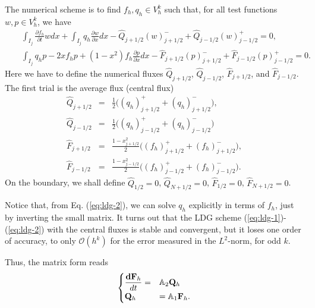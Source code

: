 \documentclass[final,leqno]{siamltex704}
\begin{document}
The numerical scheme is to find $f_h,q_h\in V_h^k$ such that, for all test functions $w,p\in V_h^k$, we have
\begin{eqnarray}
&&\int_{I_j}\frac{\partial f_h}{\partial t}wdx+\int_{I_j}q_h\frac{\partial w}{\partial x}dx-\hat{Q}_{j+1/2}(w)^-_{j+1/2}+\hat{Q}_{j-1/2}(w)^+_{j-1/2}=0,\label{eq:ldg-1}\\
&&\int_{I_j}q_h p-2xf_h p+(1-x^2)f_h\frac{\partial p}{\partial x}dx-\hat{F}_{j+1/2}(p)^-_{j+1/2}+\hat{F}_{j-1/2}(p)^+_{j-1/2}=0.\label{eq:ldg-2}
\end{eqnarray}
Here we have to define the numerical fluxes $\hat{Q}_{j+1/2}$, $\hat{Q}_{j-1/2}$, $\hat{F}_{j+1/2}$, and $\hat{F}_{j-1/2}$. The first trial is the average flux (central flux)
\begin{eqnarray}
\hat{Q}_{j+1/2}&=&\frac{1}{2}\bigg((q_h)_{j+1/2}^++(q_h)_{j+1/2}^-\bigg),\\
 \hat{Q}_{j-1/2}&=&\frac{1}{2}\bigg((q_h)_{j-1/2}^++(q_h)_{j-1/2}^-\bigg)\\
\hat{F}_{j+1/2}&=&\frac{1-x_{j+1/2}^2}{2}\bigg((f_h)_{j+1/2}^++(f_h)_{j+1/2}^-\bigg),\\
 \hat{F}_{j-1/2}&=&\frac{1-x_{j-1/2}^2}{2}\bigg((f_h)_{j-1/2}^++(f_h)_{j-1/2}^-\bigg).
\end{eqnarray}
On the boundary, we shall define $\hat{Q}_{1/2}=0$, $\hat{Q}_{N+1/2}=0$, $\hat{F}_{1/2}=0$, $\hat{F}_{N+1/2}=0$.


Notice that, from Eq. (\ref{eq:ldg-2}), we can solve $q_h$ explicitly in terms of $f_h$, just by inverting the small matrix. It turns out that the LDG scheme (\ref{eq:ldg-1})-(\ref{eq:ldg-2}) with the central fluxes is stable and convergent, but it loses one order of accuracy, to only $\mathcal{O}(h^k)$ for the error measured in the $L^2$-norm, for odd $k$.

Thus, the matrix form reads
\begin{eqnarray*}
\begin{cases}
\dfrac{{\bf dF}_h}{dt} =& \mathbb{A}_{2}{\bf Q}_h \\
{\bf Q}_h &= \mathbb{A}_{1} {\bf F}_h.
\end{cases}
\end{eqnarray*}
\end{document}
